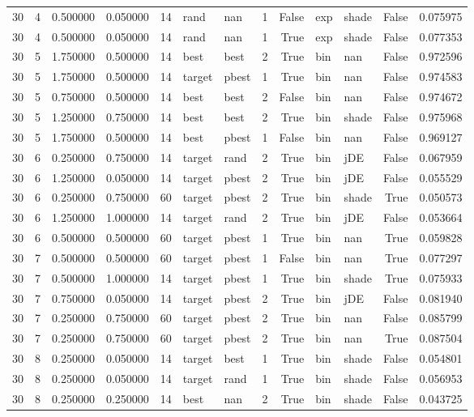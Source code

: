 \begin{tabular}{rrrrrllrrllrr}
30 & 4 & 0.500000 & 0.050000 & 14 & rand & nan & 1 & False & exp & shade & False & 0.075975 \\
30 & 4 & 0.500000 & 0.050000 & 14 & rand & nan & 1 & True & exp & shade & False & 0.077353 \\
30 & 5 & 1.750000 & 0.500000 & 14 & best & best & 2 & True & bin & nan & False & 0.972596 \\
30 & 5 & 1.750000 & 0.500000 & 14 & target & pbest & 1 & True & bin & nan & False & 0.974583 \\
30 & 5 & 0.750000 & 0.500000 & 14 & best & best & 2 & False & bin & nan & False & 0.974672 \\
30 & 5 & 1.250000 & 0.750000 & 14 & best & best & 2 & True & bin & shade & False & 0.975968 \\
30 & 5 & 1.750000 & 0.500000 & 14 & best & pbest & 1 & False & bin & nan & False & 0.969127 \\
30 & 6 & 0.250000 & 0.750000 & 14 & target & rand & 2 & True & bin & jDE & False & 0.067959 \\
30 & 6 & 1.250000 & 0.050000 & 14 & target & pbest & 2 & True & bin & jDE & False & 0.055529 \\
30 & 6 & 0.250000 & 0.750000 & 60 & target & pbest & 2 & True & bin & shade & True & 0.050573 \\
30 & 6 & 1.250000 & 1.000000 & 14 & target & rand & 2 & True & bin & jDE & False & 0.053664 \\
30 & 6 & 0.500000 & 0.500000 & 60 & target & pbest & 1 & True & bin & nan & True & 0.059828 \\
30 & 7 & 0.500000 & 0.500000 & 60 & target & pbest & 1 & False & bin & nan & True & 0.077297 \\
30 & 7 & 0.500000 & 1.000000 & 14 & target & pbest & 1 & True & bin & shade & True & 0.075933 \\
30 & 7 & 0.750000 & 0.050000 & 14 & target & pbest & 2 & True & bin & jDE & False & 0.081940 \\
30 & 7 & 0.250000 & 0.750000 & 60 & target & pbest & 2 & True & bin & nan & False & 0.085799 \\
30 & 7 & 0.250000 & 0.750000 & 60 & target & pbest & 2 & True & bin & nan & True & 0.087504 \\
30 & 8 & 0.250000 & 0.050000 & 14 & target & best & 1 & True & bin & shade & False & 0.054801 \\
30 & 8 & 0.250000 & 0.050000 & 14 & target & rand & 1 & True & bin & shade & False & 0.056953 \\
30 & 8 & 0.250000 & 0.250000 & 14 & best & nan & 2 & True & bin & shade & False & 0.043725 \\

\end{tabular}
